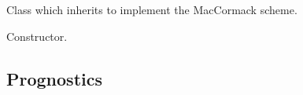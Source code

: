 \documentclass[letterpaper,10pt,english]{sphinxmanual}
\begin{document}
\begin{fulllineitems}
\label{\detokenize{api:dycore.isentropic_flux.MacCormackIsentropicFlux}}
Class which inherits {\hyperref[\detokenize{api:dycore.isentropic_flux.IsentropicFlux}]{}} to implement the MacCormack scheme.

\begin{fulllineitems}
\label{\detokenize{api:dycore.isentropic_flux.MacCormackIsentropicFlux.__init__}}
Constructor.

\end{fulllineitems}


\end{fulllineitems}



\subsection{Prognostics}
\label{\detokenize{api:prognostics}}
\end{document}

